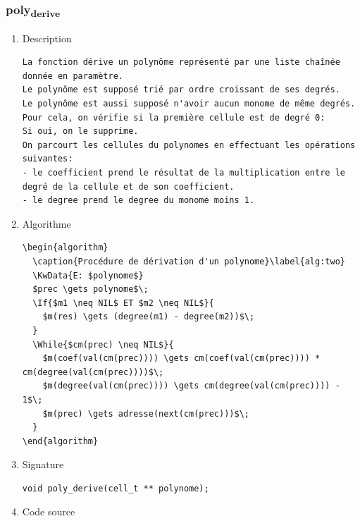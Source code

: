 \documentclass[11pt]{article}
\begin{document}
\subsubsection{poly\textsubscript{derive}}
\label{sec:org032bfa2}
\begin{enumerate}
\item Description
\label{sec:org9a60717}

\begin{verbatim}
La fonction dérive un polynôme représenté par une liste chaînée donnée en paramètre.
Le polynôme est supposé trié par ordre croissant de ses degrés.
Le polynôme est aussi supposé n'avoir aucun monome de même degrés.
Pour cela, on vérifie si la première cellule est de degré 0:
Si oui, on le supprime.
On parcourt les cellules du polynomes en effectuant les opérations suivantes:
- le coefficient prend le résultat de la multiplication entre le degré de la cellule et de son coefficient.
- le degree prend le degree du monome moins 1.
\end{verbatim}

\item Algorithme
\label{sec:org619f637}

\begin{verbatim}
\begin{algorithm}
  \caption{Procédure de dérivation d'un polynome}\label{alg:two}
  \KwData{E: $polynome$}
  $prec \gets polynome$\;
  \If{$m1 \neq NIL$ ET $m2 \neq NIL$}{
    $m(res) \gets (degree(m1) - degree(m2))$\;
  }
  \While{$cm(prec) \neq NIL$}{
    $m(coef(val(cm(prec)))) \gets cm(coef(val(cm(prec)))) * cm(degree(val(cm(prec))))$\;
    $m(degree(val(cm(prec)))) \gets cm(degree(val(cm(prec)))) - 1$\;
    $m(prec) \gets adresse(next(cm(prec)))$\;
  }
\end{algorithm}
\end{verbatim}

\item Signature
\label{sec:orga603b41}

\begin{verbatim}
void poly_derive(cell_t ** polynome);
\end{verbatim}

\item Code source
\label{sec:org92c6201}


\end{enumerate}
\end{document}
